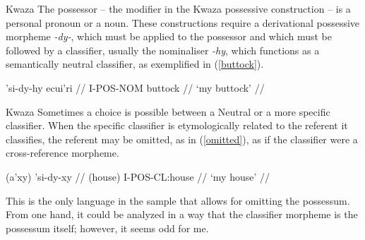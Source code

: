 \documentclass[12pt,aspectratio=169,t]{beamer}
\renewcommand{\'}{\textquotesingle}
\begin{document}
\begin{frame}{Kwaza}
	The possessor -- the modifier in the Kwaza possessive construction -- is a personal pronoun or a noun. These constructions require a derivational possessive morpheme \textit{-dy-}, which must be applied to the possessor and which must be followed by a classifier, usually the nominaliser \textit{-hy}, which functions as a semantically neutral classifier, as exemplified in (\ref{buttock}).
	
	\ex
	\begingl\label{buttock}
	\gla 'si-dy-hy ecui'ri //
	\glb I-POS-NOM buttock //
	\glft `my buttock' //
	\endgl
	\xe

\end{frame}

\begin{frame}{Kwaza}
	Sometimes a choice is possible between a Neutral or a more specific classifier. When the specific classifier is etymologically related to the referent it classifies, the referent may be omitted, as in (\ref{omitted}), as if the classifier were a cross-reference morpheme.
	
	\ex
	\begingl \label{omitted}
	\gla (a'xy) 'si-dy-xy //
	\glb (house) I-POS-CL:house //
	\glft `my house' //
	\endgl
	\xe
	
	This is the only language in the sample that allows for omitting the possessum. From one hand, it could be analyzed in a way that the classifier morpheme is the possessum itself; however, it seems odd for me.
\end{frame}
\end{document}
